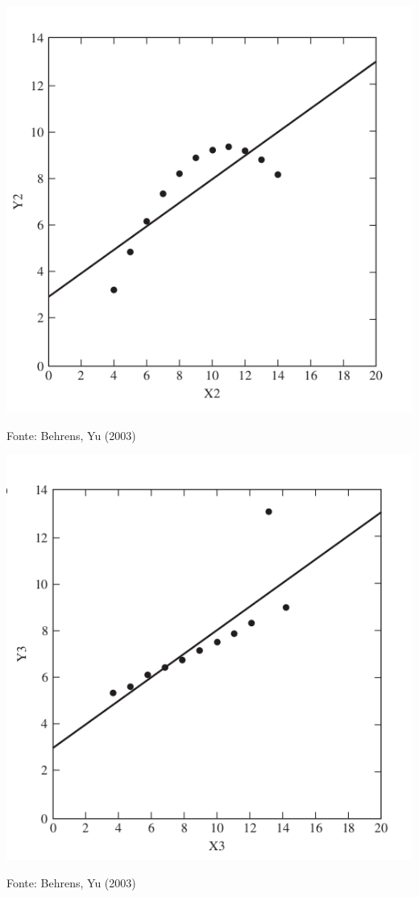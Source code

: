 \documentclass{beamer}
\begin{document}
\begin{frame}
  \begin{center}
    \includegraphics[height=0.7\textheight]{EDA/eda-dispersao2}
  \end{center}
  Fonte: Behrens, Yu (2003)
\end{frame}

\begin{frame}
  \begin{center}
    \includegraphics[height=0.7\textheight]{EDA/eda-dispersao3}
  \end{center}
  Fonte: Behrens, Yu (2003)
\end{frame}
\end{document}
